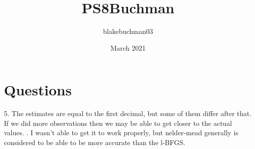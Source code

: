 \documentclass{article}
\title{PS8Buchman}
\author{blakebuchman03 }
\date{March 2021}
\begin{document}
\maketitle

\section{Questions}
5. The estimates are equal to the first decimal, but some of them differ after that. If we did more observations then we may be able to get closer to the actual values. 
. I wasn't able to get it to work properly, but nelder-mead generally is considered to be able to be more accurate than the l-BFGS. 
\end{document}
